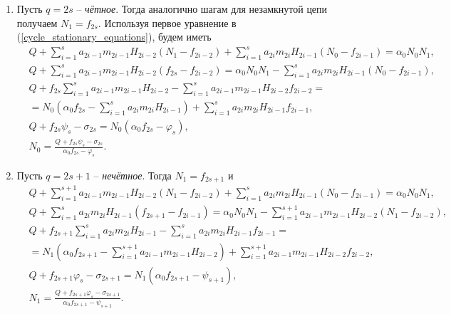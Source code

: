 \begin{enumerate}
    \item Пусть \(q = 2s\) -- \textit{чётное}. Тогда аналогично шагам для незамкнутой цепи получаем \( N_1 = f_{2s} \).
    Используя первое уравнение в (\ref{cycle_stationary_equations}), будем иметь            
    \begin{equation*}
    \begin{split}
        & Q + \sum\limits_{i=1}^{s} a_{2i-1} m_{2i-1} H_{2i-2}(N_1 - f_{2i-2}) + \sum\limits_{i=1}^{s} a_{2i} m_{2i} H_{2i-1}(N_0-f_{2i-1}) = \alpha_0 N_0 N_1, \\
        & Q + \sum\limits_{i=1}^{s} a_{2i-1} m_{2i-1} H_{2i-2}(f_{2s} - f_{2i-2})  = \alpha_0 N_0 N_1 - \sum\limits_{i=1}^{s} a_{2i} m_{2i} H_{2i-1}(N_0-f_{2i-1}), \\
        & Q + f_{2s} \sum\limits_{i=1}^{s} a_{2i-1} m_{2i-1} H_{2i-2} - \sum\limits_{i=1}^{s} a_{2i-1} m_{2i-1} H_{2i-2} f_{2i-2} = \\
        & = N_0 \left( \alpha_0 f_{2s} - \sum\limits_{i=1}^{s} a_{2i} m_{2i} H_{2i-1} \right) + \sum\limits_{i=1}^{s} a_{2i} m_{2i} H_{2i-1} f_{2i-1},  \\
        & Q + f_{2s} \psi_s - \sigma_{2s} = N_0 \left( \alpha_0 f_{2s} - \varphi_s \right), \\
        & N_0 = \frac{Q + f_{2s} \psi_s - \sigma_{2s}}{\alpha_0 f_{2s} - \varphi_s}.
    \end{split}
    \end{equation*}

    \item Пусть \(q = 2s+1\) -- \textit{нечётное}. Тогда \( N_1 = f_{2s+1} \) и
    \begin{equation*}
        \begin{split}
            & Q + \sum\limits_{i=1}^{s+1} a_{2i-1} m_{2i-1} H_{2i-2}(N_1 - f_{2i-2}) + \sum\limits_{i=1}^{s} a_{2i} m_{2i} H_{2i-1}(N_0-f_{2i-1}) = \alpha_0 N_0 N_1, \\
            & Q + \sum\limits_{i=1}^{s} a_{2i} m_{2i} H_{2i-1}(f_{2s+1} - f_{2i-1})  = \alpha_0 N_0 N_1 - \sum\limits_{i=1}^{s+1} a_{2i-1} m_{2i-1} H_{2i-2}(N_1 - f_{2i-2}), \\
            & Q + f_{2s+1} \sum\limits_{i=1}^{s} a_{2i} m_{2i} H_{2i-1} - \sum\limits_{i=1}^{s} a_{2i} m_{2i} H_{2i-1} f_{2i-1} = \\
            & = N_1 \left( \alpha_0 f_{2s+1} - \sum\limits_{i=1}^{s+1} a_{2i-1} m_{2i-1} H_{2i-2} \right) + \sum\limits_{i=1}^{s+1} a_{2i-1} m_{2i-1} H_{2i-2} f_{2i-2},  \\
            & Q + f_{2s+1} \varphi_s - \sigma_{2s+1} = N_1 \left( \alpha_0 f_{2s+1} - \psi_{s+1} \right), \\
            & N_1 = \frac{Q + f_{2s+1} \varphi_s - \sigma_{2s+1}}{ \alpha_0 f_{2s+1} - \psi_{s+1} }.
        \end{split}
        \end{equation*}
\end{enumerate}

